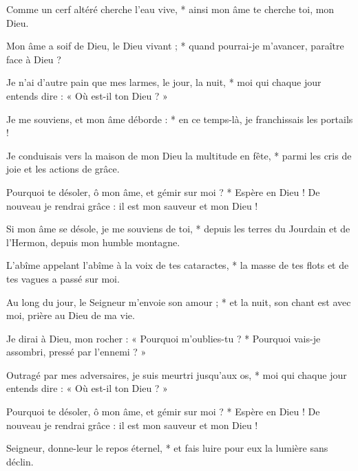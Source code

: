\item Comme un cerf altéré cherche l'eau vive, * ainsi mon âme te cherche toi, mon Dieu.

\item Mon âme a soif de Dieu, le Dieu vivant ; * quand pourrai-je m'avancer, paraître face à Dieu ?

\item Je n'ai d'autre pain que mes larmes, le jour, la nuit, * moi qui chaque jour entends dire : « Où est-il ton Dieu ? »

\item Je me souviens, et mon âme déborde : * en ce temps-là, je franchissais les portails ! 

\item Je conduisais vers la maison de mon Dieu la multitude en fête, * parmi les cris de joie et les actions de grâce.

\item Pourquoi te désoler, ô mon âme, et gémir sur moi ? * Espère en Dieu ! De nouveau je rendrai grâce : il est mon sauveur et mon Dieu !

\item Si mon âme se désole, je me souviens de toi, * depuis les terres du Jourdain et de l'Hermon, depuis mon humble montagne.

\item L'abîme appelant l'abîme à la voix de tes cataractes, * la masse de tes flots et de tes vagues a passé sur moi.

\item Au long du jour, le Seigneur m'envoie son amour ; * et la nuit, son chant est avec moi, prière au Dieu de ma vie.

\item Je dirai à Dieu, mon rocher : « Pourquoi m'oublies-tu ? * Pourquoi vais-je assombri, pressé par l'ennemi ? »

\item Outragé par mes adversaires, je suis meurtri jusqu'aux os, * moi qui chaque jour entends dire : « Où est-il ton Dieu ? »

\item Pourquoi te désoler, ô mon âme, et gémir sur moi ? * Espère en Dieu ! De nouveau je rendrai grâce : il est mon sauveur et mon Dieu !

\item Seigneur, donne-leur le repos éternel, * et fais luire pour eux la lumière sans déclin.